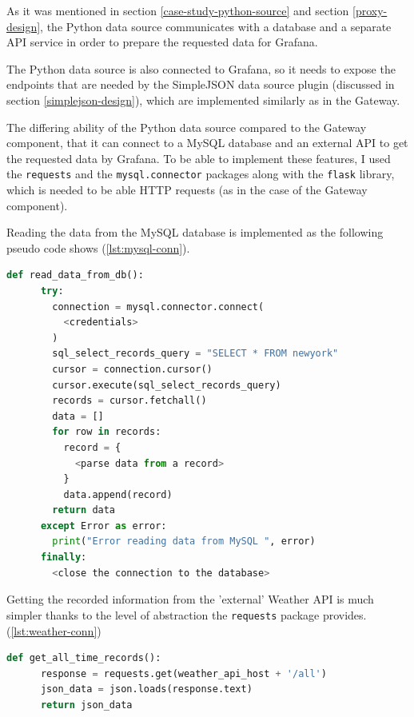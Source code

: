 As it was mentioned in section \ref{case-study-python-source} and section \ref{proxy-design}, the Python data source communicates with a database and a separate API service in order to prepare the requested data for Grafana.

The Python data source is also connected to Grafana, so it needs to expose the endpoints that are needed by the SimpleJSON data source plugin (discussed in section \ref{simplejson-design}), which are implemented similarly as in the Gateway.

The differing ability of the Python data source compared to the Gateway component, that it can connect to a MySQL database and an external API to get the requested data by Grafana. To be able to implement these features, I used the \texttt{requests} and the \texttt{mysql.connector} packages along with the \texttt{flask} library, which is needed to be able HTTP requests (as in the case of the Gateway component).


Reading the data from the MySQL database is implemented as the following pseudo code shows (\ref{lst:mysql-conn}).

\begin{minipage}[b]{\linewidth}
	\centering
	\begin{lstlisting}[language=Python, frame=single, mathescape,%
	caption={Reading data from MySQL}, label=lst:mysql-conn]
	def read_data_from_db():
	  try:
	    connection = mysql.connector.connect(
	      <credentials>
	    )
	    sql_select_records_query = "SELECT * FROM newyork"
	    cursor = connection.cursor()
	    cursor.execute(sql_select_records_query)
	    records = cursor.fetchall()
	    data = []
	    for row in records:
	      record = {
	        <parse data from a record>
	      }
	      data.append(record)
	    return data
	  except Error as error:
	    print("Error reading data from MySQL ", error)
	  finally:
	    <close the connection to the database>
	\end{lstlisting}
\end{minipage}

Getting the recorded information from the 'external' Weather API is much simpler thanks to the level of abstraction the \texttt{requests} package provides. (\ref{lst:weather-conn})

\begin{minipage}[b]{\linewidth}
	\centering
	\begin{lstlisting}[language=Python, frame=single, mathescape,%
	caption={Reading data from the Weather API}, label=lst:weather-conn]
	def get_all_time_records():
	  response = requests.get(weather_api_host + '/all')
	  json_data = json.loads(response.text)
	  return json_data
	\end{lstlisting}
\end{minipage}

